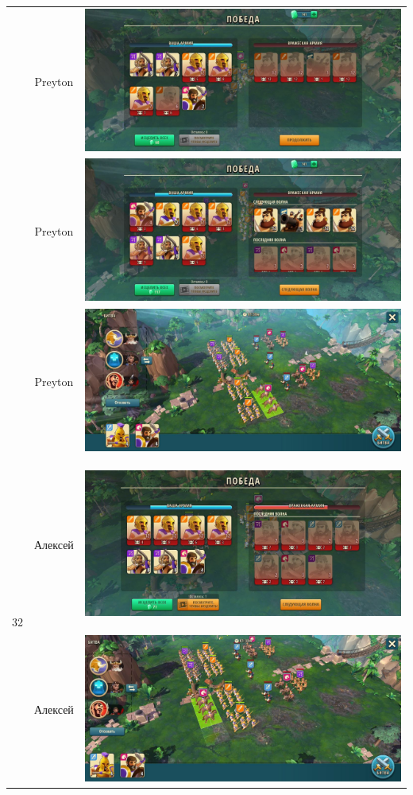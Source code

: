 \begin{longtable}{|c|c|c|}
	& Preyton &
	\includegraphics[width=0.75\linewidth]{./parts/media/TreasureHunt/32/Preyton/32_2.jpg} \\
	& Preyton &
	\includegraphics[width=0.75\linewidth]{./parts/media/TreasureHunt/32/Preyton/32_1.jpg} \\
	& Preyton &
	\includegraphics[width=0.75\linewidth]{./parts/media/TreasureHunt/32/Preyton/32.1.jpg} \\
	\hline
	\multirow{16}{*}{32} & Алексей &
	\hypertarget{fight32}{\includegraphics[width=0.75\linewidth]{./parts/media/TreasureHunt/32/alexey/photo_2022-04-14_13-54-49.jpg}} \\
	& Алексей &
	\includegraphics[width=0.75\linewidth]{./parts/media/TreasureHunt/32/alexey/photo_2022-04-14_13-54-23.jpg} \\

\end{longtable}
